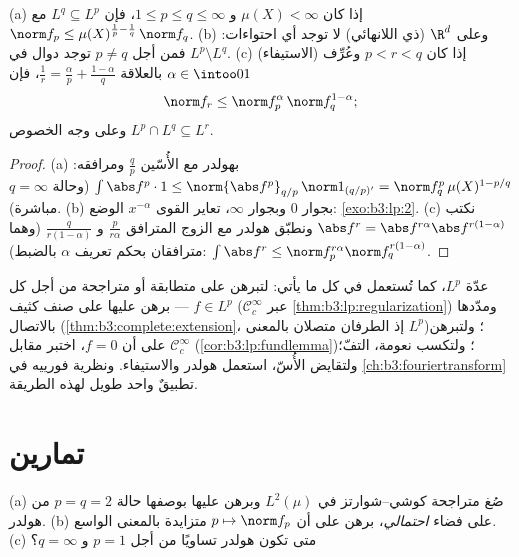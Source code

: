 \begin{proposition}\label{prop:b3:lp:inclusions}
(a) إذا كان $\mu(X) < \infty$ و $1 \leq p \leq q \leq \infty$، فإن $L^q \subseteq L^p$ مع $\norm f_p \leq
\mu(X)^{\frac1p - \frac1q}\,\norm f_q$.
(b) وعلى $\R^d$ (ذي  اللانهائي) لا توجد أي احتواءات:
فمن أجل $p \neq q$ توجد دوال في $L^p\setminus L^q$.
(c) (الاستيفاء) إذا كان $p < r < q$ وعُرِّف $\alpha \in \intoo01$ بالعلاقة
$\frac1r = \frac\alpha p + \frac{1 - \alpha}q$، فإن
\[
\norm f_r \leq \norm f_p^{\alpha}\,\norm f_q^{1 - \alpha} ;
\]
وعلى وجه الخصوص $L^p \cap L^q \subseteq L^r$.
\end{proposition}

\begin{proof}
(a) بهولدر مع الأُسّين $\frac qp$ ومرافقه:
$\int\abs f^p\cdot 1 \leq \norm{\abs f^p}_{q/p}\,\norm
1_{(q/p)'} = \norm f_q^p\,\mu(X)^{1 - p/q}$ (وحالة $q = \infty$ مباشرة). (b) بجوار $0$ وبجوار
$\infty$، تعاير القوى $x^{-\alpha}$ الوضع: \cref{exo:b3:lp:2}.
(c) نكتب $\abs f^r = \abs
f^{r\alpha}\abs f^{r(1-\alpha)}$ ونطبّق هولدر مع الزوج المترافق $\frac p{r\alpha}$
و $\frac q{r(1-\alpha)}$ (وهما مترافقان بحكم تعريف $\alpha$ بالضبط):
$\int\abs f^r \leq \norm f_p^{r\alpha}\norm f_q^{r(1 -
\alpha)}$.
\end{proof}

\begin{method}\label{met:b3:lp:toolkit}
عدّة $L^p$، كما تُستعمل في كل ما يأتي: لتبرهن على متطابقة أو
متراجحة من أجل كل $f \in L^p$ --- برهن عليها على صنف كثيف
($\mathcal C_c^\infty$ عبر \cref{thm:b3:lp:regularization}) ومدّدها بالاتصال (\cref{thm:b3:complete:extension}، إذ
الطرفان متصلان بالمعنى $L^p$)؛ ولتبرهن على أن $f = 0$، اختبر
مقابل $\mathcal
C_c^\infty$ (\cref{cor:b3:lp:fundlemma})؛ ولتكسب نعومة، التفّ؛ ولتقايض
الأُسّ، استعمل هولدر والاستيفاء. ونظرية فورييه في \cref{ch:b3:fouriertransform}
تطبيقٌ واحد طويل لهذه الطريقة.
\end{method}

\section{تمارين}

\begin{exercise}[$\star$]\label{exo:b3:lp:1}
(a) صُغ متراجحة كوشي--شوارتز في $L^2(\mu)$ وبرهن عليها بوصفها
حالة $p = q = 2$ من هولدر.
(b) على فضاء \emph{احتمالي}، برهن على أن $p \mapsto \norm f_p$ متزايدة
بالمعنى الواسع.
(c) متى تكون هولدر تساويًا من أجل $p = 1$ و $q = \infty$؟
\end{exercise}

